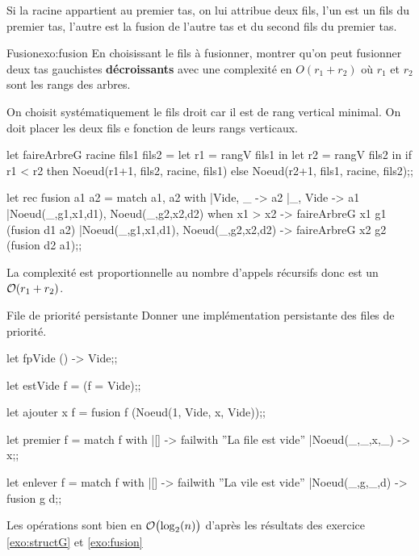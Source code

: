 Si la racine appartient au premier tas, on lui attribue deux fils, l'un est un fils du premier tas, l'autre est la fusion de l'autre tas et du second fils du premier tas.
\begin{exo}{Fusion}{exo:fusion}
En choisissant le fils à fusionner, montrer qu'on peut fusionner deux tas gauchistes {\bf décroissants} avec une complexité en $O(r_1+r_2)$ où $r_1$ et $r_2$ sont les rangs des arbres.

\reponse
On choisit systématiquement le fils droit car il est de rang vertical minimal. On doit placer les deux fils e fonction de leurs rangs verticaux.
\begin{ocaml}
let faireArbreG racine fils1 fils2 =
  let r1 = rangV fils1 in
  let r2 = rangV fils2 in
  if r1 < r2
  then Noeud(r1+1, fils2, racine, fils1)
  else Noeud(r2+1, fils1, racine, fils2);;
  
let rec fusion a1 a2 =
  match a1, a2 with
  |Vide, _ -> a2
  |_, Vide -> a1
  |Noeud(_,g1,x1,d1), Noeud(_,g2,x2,d2) when x1 > x2
         -> faireArbreG x1 g1 (fusion d1 a2)
  |Noeud(_,g1,x1,d1), Noeud(_,g2,x2,d2) 
         -> faireArbreG x2 g2 (fusion d2 a1);;
\end{ocaml}
La complexité est proportionnelle au nombre d'appels récursifs donc est un ${\cal O}(r_1+r_2)$.
\end{exo}
\begin{exo}{File de priorité persistante}{}
Donner une implémentation persistante des files de priorité.
\reponse

\begin{ocaml}
let fpVide () -> Vide;;

let estVide f = (f = Vide);;

let ajouter x f =
  fusion f (Noeud(1, Vide, x, Vide));;

let premier f = 
  match f with
  |[] -> failwith ''La file est vide''
  |Noeud(_,_,x,_) -> x;;
  
let enlever f =
  match f with
  |[] -> failwith ''La vile est vide''
  |Noeud(_,g,_,d) -> fusion g d;;
\end{ocaml}

Les opérations sont bien en ${\cal O}\bigl(\log_2(n)\bigr)$ d'après les résultats des exercice \ref{exo:structG} et  \ref{exo:fusion} 
\end{exo}
